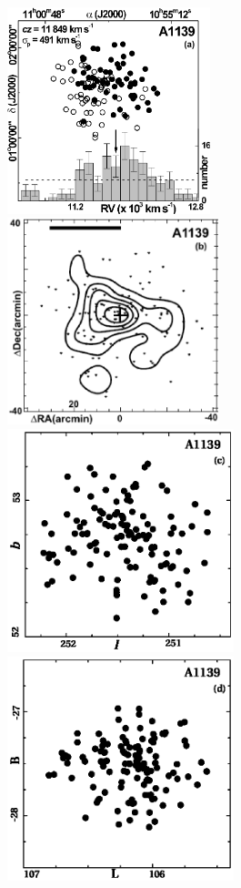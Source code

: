 \begin{figure}[H]
\centering 
\centering
   \includegraphics[height=6.0cm]{fig3a.eps}
   \includegraphics[height=6.0cm]{fig3b.eps}\\
   \includegraphics[height=6.5cm]{gal_a1139.eps}
   \includegraphics[height=6.5cm]{sup_a1139.eps}

\end{figure}
